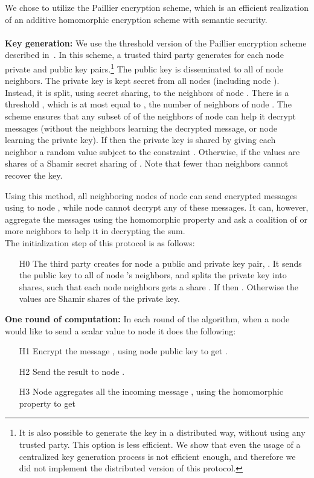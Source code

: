 \documentclass[times, 10pt,twocolumn]{article}
\begin{document}
We chose to utilize the Paillier encryption scheme, which is an
efficient realization of an additive homomorphic encryption scheme
with
semantic security.\\
\\
{\bf Key generation: } We use the threshold version of the
Paillier encryption scheme described in~\cite{Paillier2}. In this
scheme, a trusted third party generates for each node  private
and public key pairs.\footnote{It is also possible to generate the key
  in a distributed way, without using any trusted  party. This option
  is less efficient. We  show that even the usage of a
  centralized key generation process is not efficient enough, and
  therefore we did not implement the distributed version of this protocol.}
  The public key is disseminated to all of
node  neighbors. The private key  is kept
secret from all nodes (including node ). Instead, it is split,
using secret sharing, to the neighbors of node . There is a
threshold , which is at most equal to , the number of
neighbors of node . The scheme ensures that any subset of 
of the neighbors of node  can help it decrypt messages (without
the neighbors learning the decrypted message, or node  learning
the private key). If  then the private key is shared by
giving each neighbor  a random value  subject to the
constraint . Otherwise,
if  the values  are shares of a Shamir secret
sharing of . Note that fewer than  neighbors cannot
recover the key.


Using this method, all neighboring nodes of node  can send
encrypted messages using  to node , while node  cannot
decrypt any of these messages. It can, however,
aggregate the messages using the homomorphic property and ask a  coalition
of  or more neighbors to help it in decrypting the sum.\\

The initialization step of this protocol is as follows:
\begin{itemize}
\item [H0] The third party creates for node  a public and private key
  pair, . It sends the public key  to all
  of node 's neighbors, and splits  the private key into
  shares, such that each node  neighbors gets a share
  . If  then
 . Otherwise the 
 values are Shamir shares of the private key.
\end{itemize}


{\bf One round of computation: } In each round of the algorithm,
when a node  would like to send a scalar value  to node
 it does the following:
\begin{itemize}
    \item [H1] Encrypt the message , using node  public
    key to get .
    \item [H2] Send the result  to node .
    \item [H3] Node  aggregates all the incoming message , using the homomorphic
    property to get 
\end{itemize}
\end{document}
